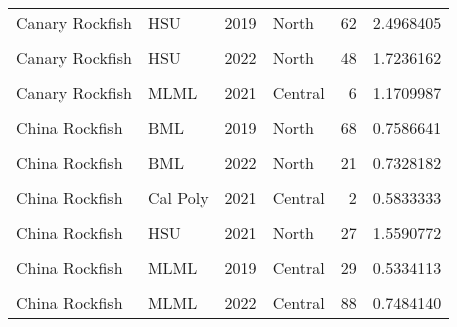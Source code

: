 \documentclass[
]{article}
\begin{document}
\begin{longtable}[t]{llrlrr}
Canary Rockfish & HSU & 2019 & North & 62 & 2.4968405\\
\cellcolor{gray!6}{Canary Rockfish} & \cellcolor{gray!6}{HSU} & \cellcolor{gray!6}{2021} & \cellcolor{gray!6}{North} & \cellcolor{gray!6}{57} & \cellcolor{gray!6}{2.3458428}\\
\addlinespace
Canary Rockfish & HSU & 2022 & North & 48 & 1.7236162\\
\cellcolor{gray!6}{Canary Rockfish} & \cellcolor{gray!6}{MLML} & \cellcolor{gray!6}{2019} & \cellcolor{gray!6}{Central} & \cellcolor{gray!6}{7} & \cellcolor{gray!6}{0.4694076}\\
Canary Rockfish & MLML & 2021 & Central & 6 & 1.1709987\\
\cellcolor{gray!6}{Canary Rockfish} & \cellcolor{gray!6}{MLML} & \cellcolor{gray!6}{2022} & \cellcolor{gray!6}{Central} & \cellcolor{gray!6}{11} & \cellcolor{gray!6}{0.7282766}\\
China Rockfish & BML & 2019 & North & 68 & 0.7586641\\
\addlinespace
\cellcolor{gray!6}{China Rockfish} & \cellcolor{gray!6}{BML} & \cellcolor{gray!6}{2021} & \cellcolor{gray!6}{North} & \cellcolor{gray!6}{60} & \cellcolor{gray!6}{1.2575488}\\
China Rockfish & BML & 2022 & North & 21 & 0.7328182\\
\cellcolor{gray!6}{China Rockfish} & \cellcolor{gray!6}{Cal Poly} & \cellcolor{gray!6}{2019} & \cellcolor{gray!6}{Central} & \cellcolor{gray!6}{3} & \cellcolor{gray!6}{0.5337796}\\
China Rockfish & Cal Poly & 2021 & Central & 2 & 0.5833333\\
\cellcolor{gray!6}{China Rockfish} & \cellcolor{gray!6}{HSU} & \cellcolor{gray!6}{2019} & \cellcolor{gray!6}{North} & \cellcolor{gray!6}{19} & \cellcolor{gray!6}{1.6524887}\\
\addlinespace
China Rockfish & HSU & 2021 & North & 27 & 1.5590772\\
\cellcolor{gray!6}{China Rockfish} & \cellcolor{gray!6}{HSU} & \cellcolor{gray!6}{2022} & \cellcolor{gray!6}{North} & \cellcolor{gray!6}{23} & \cellcolor{gray!6}{1.1298447}\\
China Rockfish & MLML & 2019 & Central & 29 & 0.5334113\\
\cellcolor{gray!6}{China Rockfish} & \cellcolor{gray!6}{MLML} & \cellcolor{gray!6}{2021} & \cellcolor{gray!6}{Central} & \cellcolor{gray!6}{60} & \cellcolor{gray!6}{0.9763152}\\
China Rockfish & MLML & 2022 & Central & 88 & 0.7484140\\

\end{longtable}
\end{document}
